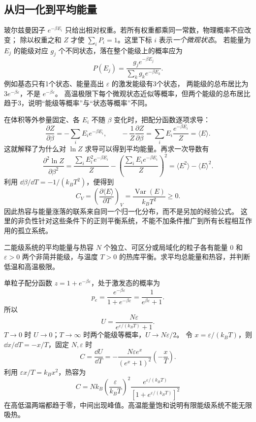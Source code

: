 \subsection{从归一化到平均能量}

玻尔兹曼因子 $e^{-\beta E_i}$ 只给出相对权重。若所有权重都乘同一常数，物理概率不应改变；
除以权重之和 $Z$ 才使 $\sum_iP_i=1$。这里下标 $i$ 表示\emph{一个微观状态}。
若能量为 $E_j$ 的能级对应 $g_j$ 个不同状态，落在整个能级上的概率应为
\[
 P(E_j)=\frac{g_je^{-\beta E_j}}{\sum_kg_ke^{-\beta E_k}}.
\]
例如基态只有1个状态、能量高出 $\varepsilon$ 的激发能级有3个状态，
两能级的总布居比为 $3e^{-\beta\varepsilon}$，不是 $e^{-\beta\varepsilon}$。
高温极限下每个微观状态近似等概率，但两个能级的总布居比趋于3，说明“能级等概率”与“状态等概率”不同。

在体积等外参量固定、各 $E_i$ 不随 $\beta$ 变化时，把配分函数逐项求导：
\[
 \frac{\partial Z}{\partial\beta}=-\sum_iE_ie^{-\beta E_i},\qquad
 -\frac1Z\frac{\partial Z}{\partial\beta}
 =\sum_iE_i\frac{e^{-\beta E_i}}Z=\langle E\rangle.
\]
这就解释了为什么对 $\ln Z$ 求导可以得到平均能量。再求一次导数有
\[
 \frac{\partial^2\ln Z}{\partial\beta^2}
 =\frac{\sum_iE_i^2e^{-\beta E_i}}Z
 -\left(\frac{\sum_iE_ie^{-\beta E_i}}Z\right)^2
 =\langle E^2\rangle-\langle E\rangle^2.
\]
利用 $\dd\beta/\dd T=-1/(k_BT^2)$，便得到
\[
 C_V=\left(\frac{\partial\langle E\rangle}{\partial T}\right)_V
 =\frac{\operatorname{Var}(E)}{k_BT^2}\ge0.
\]
因此热容与能量涨落的联系来自同一个归一化分布，而不是另加的经验公式。
这里的非负性针对这些条件下的正则平衡系统，不能不加条件推广到所有长程相互作用的孤立系统。

\begin{origexamplebox}{二能级系统的平均能量与热容}
$N$ 个独立、可区分或局域化的粒子各有能量 $0$ 和 $\varepsilon>0$ 两个非简并能级，与温度 $T>0$ 的热库平衡。求平均总能量和热容，并判断低温和高温极限。

\StatQTwoLevels
\end{origexamplebox}
\begin{xesolution}
单粒子配分函数 $z=1+e^{-\beta\varepsilon}$，处于激发态的概率为
\[
 p_e=\frac{e^{-\beta\varepsilon}}{1+e^{-\beta\varepsilon}}
 =\frac1{e^{\beta\varepsilon}+1}.
\]
所以
\[
 \boxed{U=\frac{N\varepsilon}{e^{\varepsilon/(k_BT)}+1}}.
\]
$T\to0$ 时 $U\to0$；$T\to\infty$ 时两个能级等概率，$U\to N\varepsilon/2$。
令 $x=\varepsilon/(k_BT)$，则 $\dd x/\dd T=-x/T$，固定 $N,\varepsilon$ 时
\[ C=\frac{\dd U}{\dd T}
=-\frac{N\varepsilon e^x}{(e^x+1)^2}\left(-\frac{x}{T}\right).\]
利用 $\varepsilon x/T=k_Bx^2$，热容为
\[
 C=Nk_B\left(\frac{\varepsilon}{k_BT}\right)^2
 \frac{e^{\varepsilon/(k_BT)}}{[1+e^{\varepsilon/(k_BT)}]^2}
\]
在高低温两端都趋于零，中间出现峰值。高温能量饱和说明有限能级系统不能无限吸热。

\StatATwoLevels
\end{xesolution}

